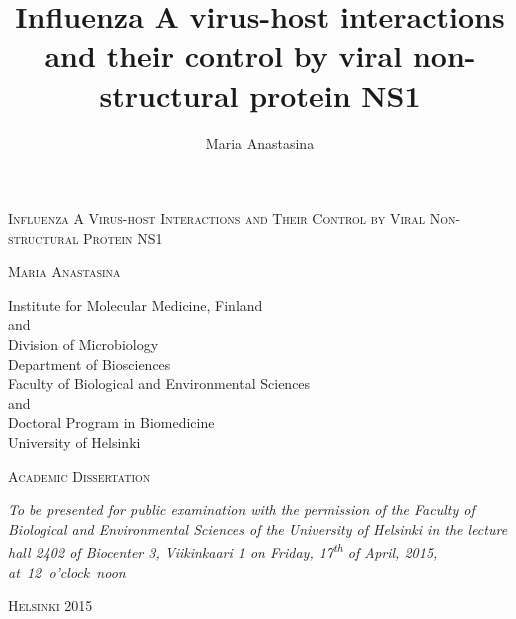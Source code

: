 \documentclass[a4paper,12pt]{article} %
\title{Influenza A virus-host interactions \\ and their control by viral non-structural protein NS1}
\author{Maria Anastasina}
\begin{document}
\begin{singlespace}


\begin{titlepage}
	\begin{center}
	
	
		\thispagestyle{empty}
		\vspace*{1.5 cm}	
	
		\LARGE \textsc{Influenza A Virus-host Interactions and Their Control by Viral Non-structural Protein NS1}
		
		\vspace{2 cm}
		
		\Large \textsc{Maria Anastasina}
		
		\vspace{2 cm}
		
		\large Institute for Molecular Medicine, Finland \\
		and\\
		Division of Microbiology \\
		Department of Biosciences \\
		Faculty of Biological and Environmental Sciences\\
		and\\
		Doctoral Program in Biomedicine\\
		University of Helsinki
		
		\vspace{2.5 cm}
		
		\large \textsc{Academic Dissertation}
		
		\vspace{1 cm}		
		
		\textit{To be presented for public examination with the permission of the Faculty of Biological and Environmental Sciences of the University of Helsinki in the lecture hall 2402 of Biocenter 3, Viikinkaari 1 on Friday, 17\textsuperscript{th} of April, 2015, at~12~o'clock~noon}
		
		\vspace{1.5 cm}
		\large \textsc{Helsinki 2015}
	\end{center}
\end{titlepage}

\newpage
\thispagestyle{empty}


\end{singlespace}
\end{document}
